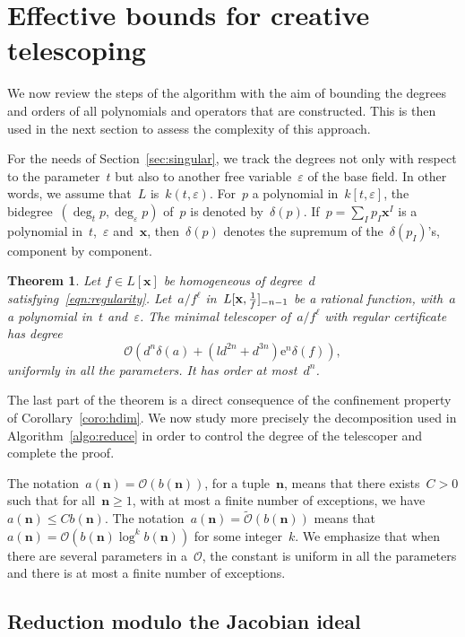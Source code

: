 \documentclass{sig-alternate}
\newtheorem{thm}{Theorem}
\newcommand{\softO}{\tilde{\mathcal{O}}}
\newcommand{\bigO}{{\mathcal{O}}}
\newcommand{\xx}{\mathbf{x}}
\newcommand{\Lxfp}{\Lxf_{\smash{-n-1}}}
\newcommand{\Lxf}{L[\xx,\smash{\tfrac{1}{f}}]}
\newcommand{\eexp}{\mathrm{e}}
\begin{document}
\section{Effective bounds for creative telescoping}\label{sec:eff-bounds}

\noindent We now review the steps of the algorithm with the aim of bounding the degrees and orders of all polynomials and operators that are constructed.
This is then used in the next section to assess the complexity of this approach.

For the needs of Section~\ref{sec:singular}, we track the degrees not only with respect to the parameter~$t$ but also to another free variable~$\varepsilon$ of the base field. 
In other words, we assume that~$L$ is~$k(t,\varepsilon)$.
For~$p$ a polynomial in~$k[t,\varepsilon]$, the bi\-degree~$(\deg_t p, \deg_\varepsilon p)$ of~$p$ is denoted by~$\delta(p)$.
If~$p=\sum_I p_I \mathbf x^I$ is a polynomial in~$t$,~$\varepsilon$ and~$\mathbf x$, then~$\delta(p)$ denotes the supremum of the~$\delta(p_I)$'s, component by component.


\begin{thm}\label{coro:asy-deg}
Let $f\in L[\xx]$ be homogeneous of degree~$d$ satisfying~\eqref{eqn:regularity}.
  Let~$a/f^\ell$ in~$\Lxfp$ be a rational function, with~$a$ a polynomial in~$t$ and~$\varepsilon$.
  The minimal telescoper  of~$a/f^\ell$  with regular certificate has  degree
  \[ \bigO \left( d^n \delta(a) + \left( ld^{2n}+ d^{3n} \right)\eexp^{n} \delta(f) \right), \]
  uniformly in all the parameters. It has order at most~$d^n$.
\end{thm}
The last part of the theorem is a direct consequence of the confinement property of Corollary~\ref{coro:hdim}.
We now study more precisely the decomposition used in Algorithm~\ref{algo:reduce} in order to control the degree of the telescoper and complete the proof.

The notation~$a(\mathbf n) = \bigO(b(\mathbf n))$, for a tuple~$\mathbf n$, means that there exists~$C>0$ such that for all~$\mathbf n \geqslant 1$, with at most a finite number of exceptions, we have~$a(\mathbf n) \leqslant Cb(\mathbf n)$.
The notation~$a(\mathbf n) = \softO(b(\mathbf n))$ means that~$a(\mathbf n) = \bigO(b(\mathbf n) \log^k b(\mathbf n))$ for some integer~$k$.
We emphasize that when there are several parameters in a~$\bigO$, the constant is uniform in all the parameters and there is at most a finite number of exceptions.


\subsection{Reduction modulo the Jacobian ideal}
\label{sec:red-mod-jac}
\end{document}
